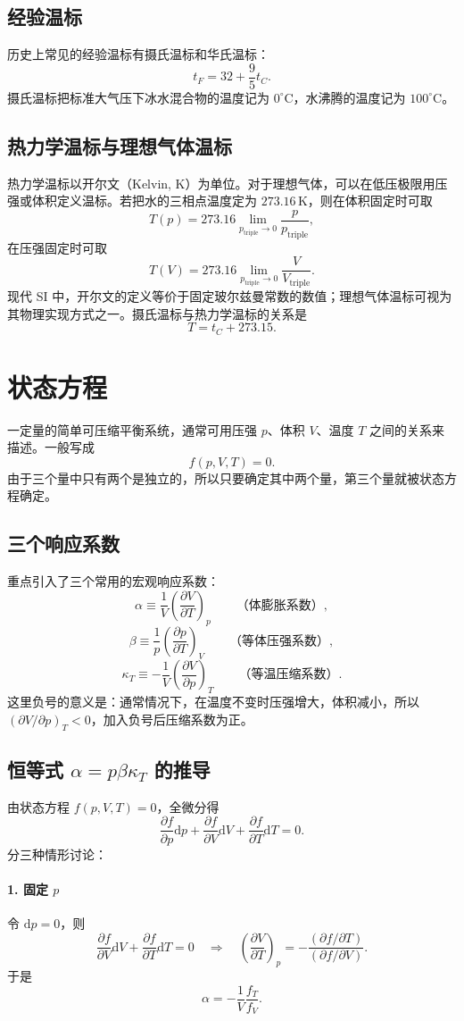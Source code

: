 \documentclass[11pt,a4paper,openany]{ctexbook}
\newcommand{\dd}{\mathrm d}
\newcommand{\pp}[2]{\frac{\partial #1}{\partial #2}}
\begin{document}
\subsection*{经验温标}
历史上常见的经验温标有摄氏温标和华氏温标：
\[
t_{F}=32+\frac95t_C .
\]
摄氏温标把标准大气压下冰水混合物的温度记为 $0^\circ\mathrm C$，水沸腾的温度记为 $100^\circ\mathrm C$。

\subsection*{热力学温标与理想气体温标}
热力学温标以开尔文（Kelvin, K）为单位。对于理想气体，可以在低压极限用压强或体积定义温标。若把水的三相点温度定为 $273.16\,\mathrm K$，则在体积固定时可取
\[
T(p)=273.16\lim_{p_{\mathrm{triple}}\to0}\frac{p}{p_{\mathrm{triple}}},
\]
在压强固定时可取
\[
T(V)=273.16\lim_{p_{\mathrm{triple}}\to0}\frac{V}{V_{\mathrm{triple}}}.
\]
现代 SI 中，开尔文的定义等价于固定玻尔兹曼常数的数值；理想气体温标可视为其物理实现方式之一。摄氏温标与热力学温标的关系是
\[
T=t_C+273.15 .
\]

\section{状态方程}
一定量的简单可压缩平衡系统，通常可用压强 $p$、体积 $V$、温度 $T$ 之间的关系来描述。一般写成
\[
f(p,V,T)=0.
\]
由于三个量中只有两个是独立的，所以只要确定其中两个量，第三个量就被状态方程确定。

\subsection*{三个响应系数}
重点引入了三个常用的宏观响应系数：
\[
\alpha\equiv \frac1V\left(\pp VT\right)_p
\qquad \text{（体膨胀系数）},
\]
\[
\beta\equiv \frac1p\left(\pp pT\right)_V
\qquad \text{（等体压强系数）},
\]
\[
\kappa_T\equiv -\frac1V\left(\pp Vp\right)_T
\qquad \text{（等温压缩系数）}.
\]
这里负号的意义是：通常情况下，在温度不变时压强增大，体积减小，所以 $\left(\partial V/\partial p\right)_T<0$，加入负号后压缩系数为正。

\subsection*{恒等式 $\alpha=p\beta\kappa_T$ 的推导}
由状态方程 $f(p,V,T)=0$，全微分得
\[
\pp fp\dd p+\pp fV\dd V+\pp fT\dd T=0.
\]
分三种情形讨论：

\paragraph{1. 固定 $p$} 令 $\dd p=0$，则
\[
\pp fV \dd V+\pp fT \dd T=0
\quad\Longrightarrow\quad
\left(\pp VT\right)_p=-\frac{(\partial f/\partial T)}{(\partial f/\partial V)}.
\]
于是
\[
\alpha=-\frac1V\frac{f_T}{f_V}.
\]
\end{document}
